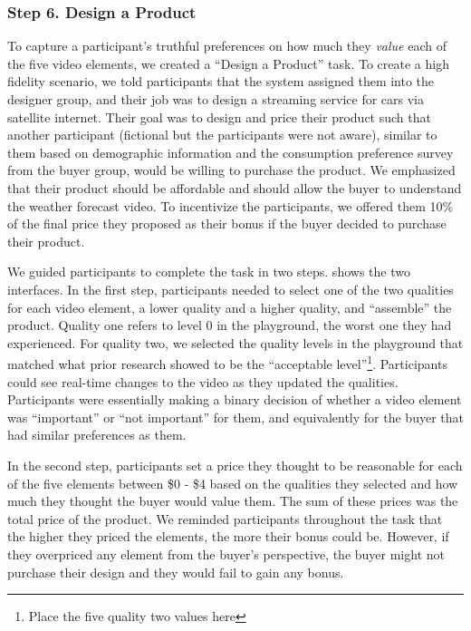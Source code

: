 \subsubsection{Step 6. Design a Product}
To capture a participant's truthful preferences on how much they \textit{value} each of the five video elements, we created a ``Design a Product'' task. To create a high fidelity scenario, we told participants that the system assigned them into the designer group, and their job was to design a streaming service for cars via satellite internet. Their goal was to design and price their product such that another participant (fictional but the participants were not aware), similar to them based on demographic information and the consumption preference survey from the buyer group, would be willing to purchase the product. We emphasized that their product should be affordable and should allow the buyer to understand the weather forecast video. To incentivize the participants, we offered them 10\% of the final price they proposed as their bonus if the buyer decided to purchase their product.


We guided participants to complete the task in two steps.  shows the two interfaces. In the first step, participants needed to select one of the two qualities for each video element, a lower quality and a higher quality, and ``assemble'' the product. Quality one refers to level 0 in the playground, the worst one they had experienced. For quality two, we selected the quality levels in the playground that matched what prior research showed to be the ``acceptable level''\footnote{Place the five quality two values here}. Participants could see real-time changes to the video as they updated the qualities. Participants were essentially making a binary decision of whether a video element was ``important'' or ``not important'' for them, and equivalently for the buyer that had similar preferences as them. 

In the second step, participants set a price they thought to be reasonable for each of the five elements between \$0 - \$4 based on the qualities they selected and how much they thought the buyer would value them. The sum of these prices was the total price of the product. We reminded participants throughout the task that the higher they priced the elements, the more their bonus could be. However, if they overpriced any element from the buyer's perspective, the buyer might not purchase their design and they would fail to gain any bonus. 

